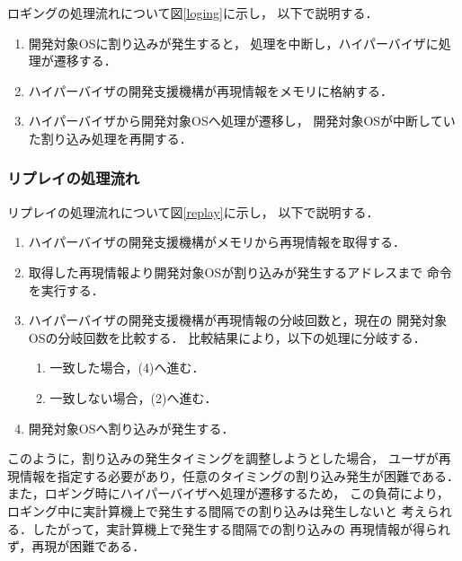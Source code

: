 \documentclass[submit,techreq,noauthor,dvipdfmx]{ipsj}
\begin{document}

ロギングの処理流れについて図\ref{loging}に示し，
以下で説明する．

\begin{enumerate}
    \item 
        開発対象OSに割り込みが発生すると，
        処理を中断し，ハイパーバイザに処理が遷移する．
    \item 
        ハイパーバイザの開発支援機構が再現情報をメモリに格納する．
    \item 
        ハイパーバイザから開発対象OSへ処理が遷移し，
        開発対象OSが中断していた割り込み処理を再開する．
\end{enumerate}

\subsubsection{リプレイの処理流れ}


リプレイの処理流れについて図\ref{replay}に示し，
以下で説明する．
\begin{enumerate}
    \item 
        ハイパーバイザの開発支援機構がメモリから再現情報を取得する．
    \item 
        取得した再現情報より開発対象OSが割り込みが発生するアドレスまで
        命令を実行する．
    \item 
        ハイパーバイザの開発支援機構が再現情報の分岐回数と，現在の
        開発対象OSの分岐回数を比較する．
        比較結果により，以下の処理に分岐する．
        \begin{enumerate}
            \item 一致した場合，(4)へ進む．
            \item 一致しない場合，(2)へ進む．
        \end{enumerate}
    \item 
        開発対象OSへ割り込みが発生する．
\end{enumerate}

このように，割り込みの発生タイミングを調整しようとした場合，
ユーザが再現情報を指定する必要があり，任意のタイミングの割り込み発生が困難である．
また，ロギング時にハイパーバイザへ処理が遷移するため，
この負荷により，ロギング中に実計算機上で発生する間隔での割り込みは発生しないと
考えられる．したがって，実計算機上で発生する間隔での割り込みの
再現情報が得られず，再現が困難である．
\end{document}
